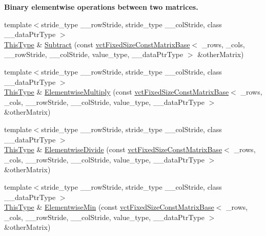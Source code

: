 \begin{Indent}{\bf Binary elementwise operations between two matrices.}
\begin{DoxyCompactItemize}
\item 
{\footnotesize template$<$stride\-\_\-type \-\_\-\-\_\-row\-Stride, stride\-\_\-type \-\_\-\-\_\-col\-Stride, class \-\_\-\-\_\-data\-Ptr\-Type $>$ }\\\hyperlink{classvct_fixed_size_const_matrix_base_a7ec66a96ed7e08ce9ff54093133c9d8d}{This\-Type} \& \hyperlink{classvct_fixed_size_matrix_base_ad6fc2d101a0535ea5b0498792882eee4}{Subtract} (const \hyperlink{classvct_fixed_size_const_matrix_base}{vct\-Fixed\-Size\-Const\-Matrix\-Base}$<$ \-\_\-rows, \-\_\-cols, \-\_\-\-\_\-row\-Stride, \-\_\-\-\_\-col\-Stride, value\-\_\-type, \-\_\-\-\_\-data\-Ptr\-Type $>$ \&other\-Matrix)
\item 
{\footnotesize template$<$stride\-\_\-type \-\_\-\-\_\-row\-Stride, stride\-\_\-type \-\_\-\-\_\-col\-Stride, class \-\_\-\-\_\-data\-Ptr\-Type $>$ }\\\hyperlink{classvct_fixed_size_const_matrix_base_a7ec66a96ed7e08ce9ff54093133c9d8d}{This\-Type} \& \hyperlink{classvct_fixed_size_matrix_base_a4c5b8b57849c33c9b9dd4583381582bf}{Elementwise\-Multiply} (const \hyperlink{classvct_fixed_size_const_matrix_base}{vct\-Fixed\-Size\-Const\-Matrix\-Base}$<$ \-\_\-rows, \-\_\-cols, \-\_\-\-\_\-row\-Stride, \-\_\-\-\_\-col\-Stride, value\-\_\-type, \-\_\-\-\_\-data\-Ptr\-Type $>$ \&other\-Matrix)
\item 
{\footnotesize template$<$stride\-\_\-type \-\_\-\-\_\-row\-Stride, stride\-\_\-type \-\_\-\-\_\-col\-Stride, class \-\_\-\-\_\-data\-Ptr\-Type $>$ }\\\hyperlink{classvct_fixed_size_const_matrix_base_a7ec66a96ed7e08ce9ff54093133c9d8d}{This\-Type} \& \hyperlink{classvct_fixed_size_matrix_base_a96667acddd1fd252e198c16ee59ecf32}{Elementwise\-Divide} (const \hyperlink{classvct_fixed_size_const_matrix_base}{vct\-Fixed\-Size\-Const\-Matrix\-Base}$<$ \-\_\-rows, \-\_\-cols, \-\_\-\-\_\-row\-Stride, \-\_\-\-\_\-col\-Stride, value\-\_\-type, \-\_\-\-\_\-data\-Ptr\-Type $>$ \&other\-Matrix)
\item 
{\footnotesize template$<$stride\-\_\-type \-\_\-\-\_\-row\-Stride, stride\-\_\-type \-\_\-\-\_\-col\-Stride, class \-\_\-\-\_\-data\-Ptr\-Type $>$ }\\\hyperlink{classvct_fixed_size_const_matrix_base_a7ec66a96ed7e08ce9ff54093133c9d8d}{This\-Type} \& \hyperlink{classvct_fixed_size_matrix_base_ac44374de7e3e2bc54adc31d4ca40ccbe}{Elementwise\-Min} (const \hyperlink{classvct_fixed_size_const_matrix_base}{vct\-Fixed\-Size\-Const\-Matrix\-Base}$<$ \-\_\-rows, \-\_\-cols, \-\_\-\-\_\-row\-Stride, \-\_\-\-\_\-col\-Stride, value\-\_\-type, \-\_\-\-\_\-data\-Ptr\-Type $>$ \&other\-Matrix)

\end{DoxyCompactItemize}
\end{Indent}
